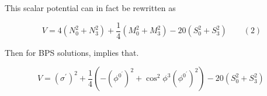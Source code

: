 \documentclass{article}
\begin{document}
This scalar potential can in fact be rewritten as


\begin{equation}
V = 4 ( N _ { 0 } ^ { 2 } + N _ { 3 } ^ { 2 } ) + \frac { 1 } { 4 } ( M _ { 0 } ^ { 2 } + M _ { 3 } ^ { 2 } ) - 2 0 ( S _ { 0 } ^ { 2 } + S _ { 3 } ^ { 2 } ) \qquad ( 2 )
\end{equation}


Then for BPS solutions, implies that.


\begin{equation}
V = ( \sigma ^ { \prime } ) ^ { 2 } + \frac { 1 } { 4 } \left ( - ( \phi ^ { 0 ^ { \prime } } ) ^ { 2 } + \cos ^ { 2 } \phi ^ { 3 } ( \phi ^ { 0 ^ { \prime } } ) ^ { 2 } \right ) - 2 0 ( S _ { 0 } ^ { 2 } + S _ { 3 } ^ { 2 } ) ~
\end{equation}
\end{document}
